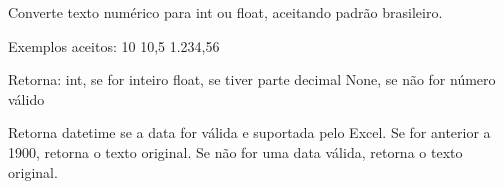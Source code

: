 \documentclass[letterpaper,10pt,english]{sphinxmanual}
\begin{document}

\begin{fulllineitems}
\label{\detokenize{api/excel_io:excel_io.parse_br_number}}
\pysigstartsignatures
\pysiglinewithargsret
{}
{}
{}
\pysigstopsignatures
\sphinxAtStartPar
Converte texto numérico para int ou float, aceitando padrão brasileiro.

\sphinxAtStartPar
Exemplos aceitos:
\sphinxhyphen{} 10
\sphinxhyphen{} 10,5
\sphinxhyphen{} 1.234,56

\sphinxAtStartPar
Retorna:
\sphinxhyphen{} int, se for inteiro
\sphinxhyphen{} float, se tiver parte decimal
\sphinxhyphen{} None, se não for número válido

\end{fulllineitems}


\begin{fulllineitems}
\label{\detokenize{api/excel_io:excel_io.parse_br_date_or_text}}
\pysigstartsignatures
\pysiglinewithargsret
{}
{}
{}
\pysigstopsignatures
\sphinxAtStartPar
Retorna datetime se a data for válida e suportada pelo Excel.
Se for anterior a 1900, retorna o texto original.
Se não for uma data válida, retorna o texto original.

\end{fulllineitems}

\end{document}
